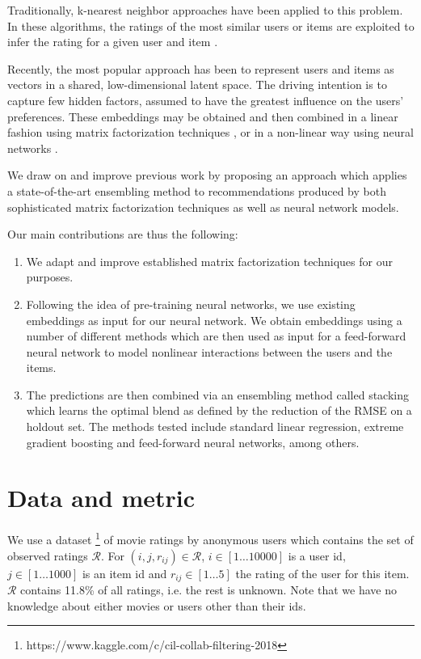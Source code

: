 \documentclass[10pt,conference,compsocconf]{IEEEtran}
\begin{document}
Traditionally, k-nearest neighbor approaches have been applied to this problem. In these algorithms, the ratings of the most similar users or items are exploited to infer the rating for a given user and item \cite{sarwar2001item}.

Recently, the most popular approach has been to represent users and items  as vectors in a shared, low-dimensional latent space. The driving intention is to capture few hidden factors, assumed to have the greatest influence on the users' preferences. These embeddings may be obtained and then combined in a linear fashion using matrix factorization techniques \cite{koren2009matrix}, or in a non-linear way using neural networks \cite{he2017neural}.

We draw on and improve previous work by proposing an approach which applies a state-of-the-art ensembling method to recommendations produced by both sophisticated matrix factorization techniques as well as neural network models.

Our main contributions are thus the following:
\begin{enumerate}
    \item We adapt and improve established matrix factorization techniques for our purposes.
    \item Following the idea of pre-training neural networks, we use existing embeddings as input for our neural network. We obtain embeddings using a number of different methods which are then used as input for a feed-forward neural network to model nonlinear interactions between the users and the items.
    \item The predictions are then combined via an ensembling method called stacking which learns the optimal blend as defined by the reduction of the RMSE on a holdout set. The methods tested include standard linear regression, extreme gradient boosting and feed-forward neural networks, among others.
\end{enumerate}


\section{Data and metric}
We use a dataset \footnote{https://www.kaggle.com/c/cil-collab-filtering-2018} of movie ratings by anonymous users which contains the set of observed ratings $\mathcal{R}$. For $(i, j, r_{ij}) \in \mathcal{R}$, $i \in [1\dots10000]$ is a user id, $j \in [1\dots1000]$  is an item id and $r_{ij} \in [1\dots5]$ the rating of the user for this item. $\mathcal{R}$ contains 11.8\% of all ratings, i.e. the rest is unknown. Note that we have no knowledge about either movies or users other than their ids.
\end{document}
